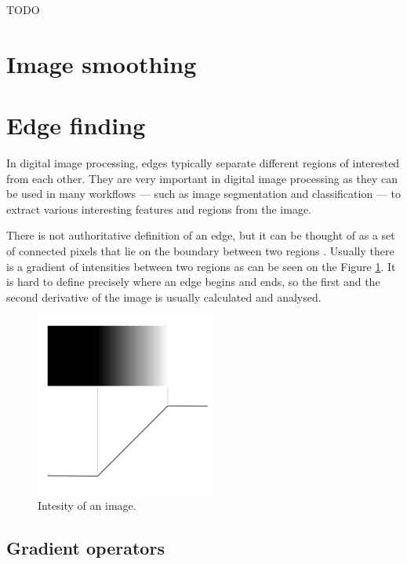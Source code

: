 \documentclass[
  digital,     %
  oneside,     %
  nosansbold,  %
  nocolorbold, %
  lof,         %
  lot,         %
]{fithesis4}
\begin{document}
TODO

\section{Image smoothing}

\section{Edge finding}

In digital image processing, edges typically separate different regions of
interested from each other. They are very important in digital image processing
as they can be used in many workflows --- such as image segmentation and
classification --- to extract various interesting features and regions
from the image.

There is not authoritative definition of an edge, but it can be thought of as a
set of connected pixels that lie on the boundary between two regions
\parencite{gonzalez2002}. Usually there is a gradient of intensities between two
regions as can be seen on the Figure \ref{fig:edge_intensities}. It is hard to
define precisely where an edge begins and ends, so the first and the second
derivative of the image is usually calculated and analysed.

\begin{figure}
    \begin{center}
        \includegraphics[width=6cm]{resources/inkscape/gradient.png}
    \end{center}
    \caption{Intesity of an image.}
    \label{fig:edge_intensities}
\end{figure}

\subsection{Gradient operators}
\end{document}
